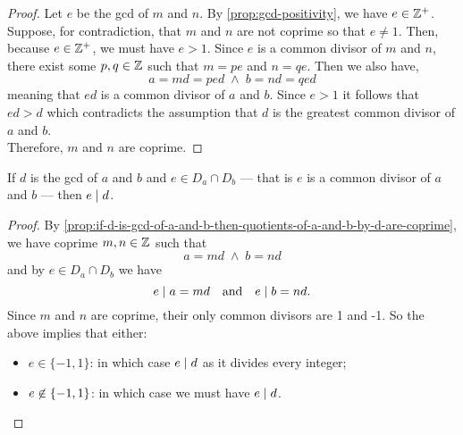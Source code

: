 \documentclass[../MathsNotesBase.tex]{subfiles}
\begin{document}
{		\bigskip
		\begin{proof}
			Let $e$ be the gcd of $m$ and $n$. By \autoref{prop:gcd-positivity}, we have ${ e \in \mathbb{Z}^{+} }$. Suppose, for contradiction, that $m$ and $n$ are not coprime so that ${ e \neq 1 }$. Then, because ${ e \in \mathbb{Z}^{+} }$, we must have ${ e > 1 }$. Since $e$ is a common divisor of $m$ and $n$, there exist some ${ p,q \in \mathbb{Z}^{} }$ such that ${ m = p e }$ and ${ n = q e }$. Then we also have,
			\[ a = md = p e d \; \land \; b = nd = q e d \]
			meaning that ${ e d }$ is a common divisor of $a$ and $b$. Since ${ e > 1 }$ it follows that ${ e d > d }$ which contradicts the assumption that $d$ is the greatest common divisor of $a$ and $b$.\\
			Therefore,  $m$ and $n$ are coprime. 
		\end{proof}
		\begin{corollary}
			If $d$ is the gcd of $a$ and $b$ and ${ e \in D_a \cap D_b }$ --- that is $e$ is a common divisor of $a$ and $b$ --- then ${ e \mid d }$.
		\end{corollary}
		\begin{proof}
			By \autoref{prop:if-d-is-gcd-of-a-and-b-then-quotients-of-a-and-b-by-d-are-coprime}, we have coprime ${ m,n \in \mathbb{Z}^{} }$ such that
			\[ a = md \; \land \; b = nd \]
			and by ${ e \in D_a \cap D_b }$ we have
			\[ e \mid a = md  \hspace{10pt}\text{and}\hspace{10pt} e \mid b = nd. \]
			Since $m$ and $n$ are coprime, their only common divisors are 1 and -1. So the above implies that either:
			\begin{itemize}
				\item ${ e \in \{-1,1\} }$: in which case ${ e \mid d }$ as it divides every integer;
				\item ${ e \centernot\in \{-1,1\} }$: in which case we must have ${ e \mid d }$.
			\end{itemize}
		\end{proof}
	

}
\end{document}
